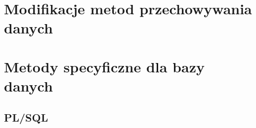\documentclass[12pt,a4paper,oneside]{report}
\begin{document}


\chapter{Modifikacje metod przechowywania danych}


\chapter{Metody specyficzne dla bazy danych}
	\section{PL/SQL}

	

	

	
	
	



\end{document}
